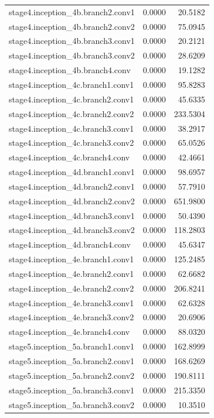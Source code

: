 \begin{longtable}{lrr}
stage4.inception_4b.branch2.conv1 & 0.0000 & 20.5182 \\
stage4.inception_4b.branch2.conv2 & 0.0000 & 75.0945 \\
stage4.inception_4b.branch3.conv1 & 0.0000 & 20.2121 \\
stage4.inception_4b.branch3.conv2 & 0.0000 & 28.6209 \\
stage4.inception_4b.branch4.conv & 0.0000 & 19.1282 \\
stage4.inception_4c.branch1.conv1 & 0.0000 & 95.8283 \\
stage4.inception_4c.branch2.conv1 & 0.0000 & 45.6335 \\
stage4.inception_4c.branch2.conv2 & 0.0000 & 233.5304 \\
stage4.inception_4c.branch3.conv1 & 0.0000 & 38.2917 \\
stage4.inception_4c.branch3.conv2 & 0.0000 & 65.0526 \\
stage4.inception_4c.branch4.conv & 0.0000 & 42.4661 \\
stage4.inception_4d.branch1.conv1 & 0.0000 & 98.6957 \\
stage4.inception_4d.branch2.conv1 & 0.0000 & 57.7910 \\
stage4.inception_4d.branch2.conv2 & 0.0000 & 651.9800 \\
stage4.inception_4d.branch3.conv1 & 0.0000 & 50.4390 \\
stage4.inception_4d.branch3.conv2 & 0.0000 & 118.2803 \\
stage4.inception_4d.branch4.conv & 0.0000 & 45.6347 \\
stage4.inception_4e.branch1.conv1 & 0.0000 & 125.2485 \\
stage4.inception_4e.branch2.conv1 & 0.0000 & 62.6682 \\
stage4.inception_4e.branch2.conv2 & 0.0000 & 206.8241 \\
stage4.inception_4e.branch3.conv1 & 0.0000 & 62.6328 \\
stage4.inception_4e.branch3.conv2 & 0.0000 & 20.6906 \\
stage4.inception_4e.branch4.conv & 0.0000 & 88.0320 \\
stage5.inception_5a.branch1.conv1 & 0.0000 & 162.8999 \\
stage5.inception_5a.branch2.conv1 & 0.0000 & 168.6269 \\
stage5.inception_5a.branch2.conv2 & 0.0000 & 190.8111 \\
stage5.inception_5a.branch3.conv1 & 0.0000 & 215.3350 \\
stage5.inception_5a.branch3.conv2 & 0.0000 & 10.3510 \\

\end{longtable}
